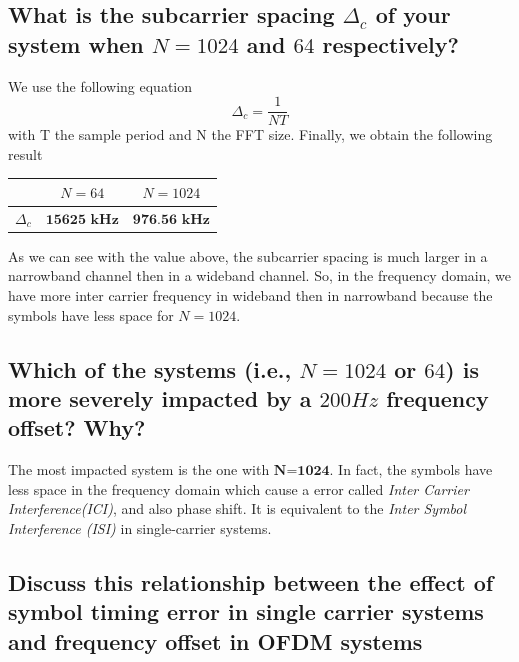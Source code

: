 \documentclass[frenchb, oneside, headings=normal]{scrartcl}
\begin{document}
\subsection{What is the subcarrier spacing $\Delta_c$ of your system when $N = 1024$ and $64$ respectively?}

We use the following equation
\begin{equation}
\Delta_c=\frac{1}{NT}
\end{equation}
with T the sample period and N the FFT size. Finally, we obtain the following result

\begin{center}
	\begin{tabular}{c|c|c}
		  & $N=64$ & $N=1024$\\
		  \hline
	$\Delta_c$ & $\textbf{15625~kHz}$ & $\textbf{976.56 kHz}$ \\
	\end{tabular}
	\label{tab3}
\end{center}

As we can see with the value above, the subcarrier spacing is much larger in a narrowband channel then in a wideband channel. So, in the frequency domain, we have more inter carrier frequency in wideband then in narrowband because the symbols have less space for $N=1024$.

\subsection{Which of the systems (i.e., $N = 1024$ or $64$) is more severely impacted by a $200 Hz$ frequency offset? Why?}

The most impacted system is the one with $\textbf{N=1024}$. In fact, the symbols have less space in the frequency domain which cause a error called \textit{Inter Carrier Interference(ICI)}, and also phase shift. It is equivalent to the \textit{Inter Symbol Interference (ISI)} in single-carrier systems.

\subsection{Discuss this relationship between the effect of symbol timing error in single carrier systems and frequency offset in OFDM systems}
\end{document}

